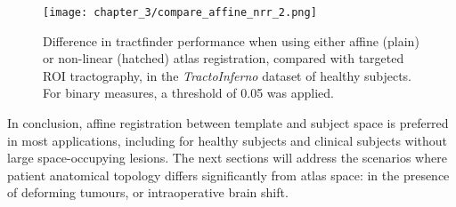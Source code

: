 \begin{figure}
  \centering
  \texttt{[image: chapter\_3/compare\_affine\_nrr\_2.png]}
  \caption{Difference in tractfinder performance when using either affine (plain) or non-linear (hatched) atlas registration, compared with targeted ROI tractography, in the \textit{TractoInferno} dataset of healthy subjects. For binary measures, a threshold of 0.05 was applied.}
  \label{fig:nrr}
\end{figure}

In conclusion, affine registration between template and subject space is preferred in most applications, including for healthy subjects and clinical subjects without large space-occupying lesions.
The next sections will address the scenarios where patient anatomical topology differs significantly from atlas space: in the presence of deforming tumours, or intraoperative brain shift.
